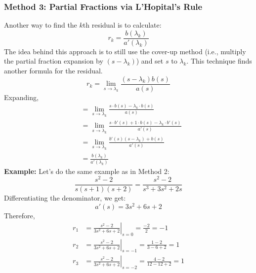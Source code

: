 \documentclass[10pt]{article}
\begin{document}
\subsubsection*{Method 3: Partial Fractions via L'Hopital's Rule}
Another way to find the $k$th residual is to calculate:
\[r_k = \frac{b(\lambda_k)}{a'(\lambda_k)}\]
The idea behind this approach is to still use the cover-up method (i.e., multiply the partial fraction expansion by $(s - \lambda_k)$) and set $s$ to $\lambda_k$.  This technique finds another formula for the residual.
\[r_k = \lim_{s \rightarrow \lambda_k} \frac{(s - \lambda_k)b(s)}{a(s)}\]
Expanding,
\begin{align*}
    &= \lim_{s \rightarrow \lambda_k} \frac{s \cdot b(s) - \lambda_k \cdot b(s)}{a(s)}\\
    &= \lim_{s \rightarrow \lambda_k} \frac{s \cdot b'(s) + 1 \cdot b(s) - \lambda_k \cdot b'(s)}{a'(s)}\\
    &= \lim_{s \rightarrow \lambda_k} \frac{b'(s) (s - \lambda_k) + b(s)}{a'(s)}\\
    &= \frac{b(\lambda_k)}{a'(\lambda_k)}
\end{align*}
\textbf{Example:} Let's do the same example as in Method 2:
\[\frac{s^2 - 2}{s(s + 1)(s + 2)} = \frac{s^2 - 2}{s^3 + 3s^2 + 2s}\]
Differentiating the denominator, we get:
\[a'(s) = 3s^2 + 6s + 2\]
Therefore,
\begin{align*}
    r_1 &= \left.\frac{s^2 - 2}{3s^2 + 6s + 2}\right|_{s = 0} = \frac{-2}{2} = -1\\
    r_2 &= \left.\frac{s^2 - 2}{3s^2 + 6s + 2}\right|_{s = -1} = \frac{1-2}{3-6+2} = 1\\
    r_3 &= \left.\frac{s^2 - 2}{3s^2 + 6s + 2}\right|_{s = -2} = \frac{4-2}{12-12+2} = 1\\
\end{align*}
\end{document}
